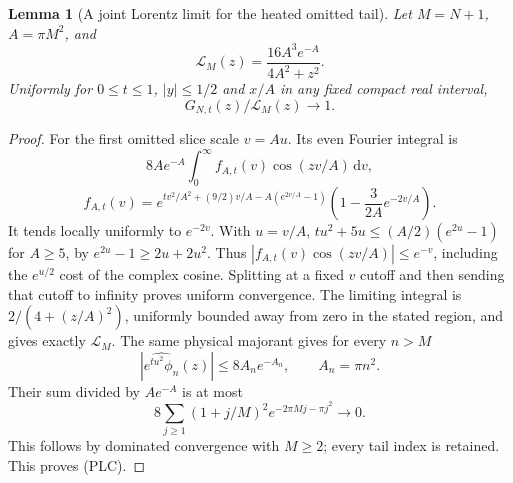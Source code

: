 \documentclass[11pt]{article}
\newtheorem{lemma}[theorem]{Lemma}
\theoremstyle{remark}\newtheorem{remark}[theorem]{Remark}
\newcommand{\dd}{\,\mathrm d}
\begin{document}
\begin{lemma}[A joint Lorentz limit for the heated omitted tail]
\label{lem:heated-tail-crossover}
Let $M=N+1$, $A=\pi M^2$, and
\[
 \mathcal L_M(z)=\frac{16A^3e^{-A}}{4A^2+z^2}.
\]
Uniformly for $0\le t\le1$, $|y|\le1/2$ and $x/A$ in any fixed
compact real interval,
\[
 G_{N,t}(z)/\mathcal L_M(z)\longrightarrow1.            \tag{PLC}
\]
\end{lemma}
\begin{proof}
For the first omitted slice scale $v=Au$. Its even Fourier integral is
\[
 8Ae^{-A}\int_0^\infty f_{A,t}(v)\cos(zv/A)\dd v,
\]
\[
 f_{A,t}(v)=e^{tv^2/A^2+(9/2)v/A-A(e^{2v/A}-1)}
              \left(1-\frac3{2A}e^{-2v/A}\right).
\]
It tends locally uniformly to $e^{-2v}$. With $u=v/A$,
$tu^2+5u\le(A/2)(e^{2u}-1)$ for $A\ge5$, by
$e^{2u}-1\ge2u+2u^2$. Thus
$|f_{A,t}(v)\cos(zv/A)|\le e^{-v}$, including the
$e^{u/2}$ cost of the complex cosine. Splitting at a fixed $v$ cutoff
and then sending that cutoff to infinity proves uniform convergence.
The limiting integral is $2/(4+(z/A)^2)$, uniformly bounded away
from zero in the stated region, and gives exactly $\mathcal L_M$.
The same physical majorant gives for every $n>M$
\[
 |\widehat{e^{tu^2}\phi_n}(z)|\le8A_ne^{-A_n},
 \qquad A_n=\pi n^2.
\]
Their sum divided by $Ae^{-A}$ is at most
\[
 8\sum_{j\ge1}(1+j/M)^2e^{-2\pi Mj-\pi j^2}\longrightarrow0.
\]
This follows by dominated convergence with $M\ge2$; every tail index
is retained. This proves (PLC).
\end{proof}
\end{document}
